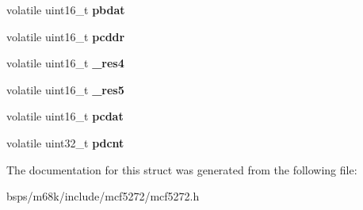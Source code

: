 \begin{DoxyCompactItemize}
\item 
\mbox{\label{structgpio__regs__t_a0a98abe30a8c4cc29ba7a40caaeab2ca}} 
volatile uint16\+\_\+t {\bfseries pbdat}
\item 
\mbox{\label{structgpio__regs__t_a88a32d5424c289f248e9c4159e7a158d}} 
volatile uint16\+\_\+t {\bfseries pcddr}
\item 
\mbox{\label{structgpio__regs__t_a869492a5c9fe94a31c16d2416a09e3c9}} 
volatile uint16\+\_\+t {\bfseries \+\_\+res4}
\item 
\mbox{\label{structgpio__regs__t_a08ecbc4e94134e38051b7d1025ecff82}} 
volatile uint16\+\_\+t {\bfseries \+\_\+res5}
\item 
\mbox{\label{structgpio__regs__t_ab3e9184400f313172c6242faeced8327}} 
volatile uint16\+\_\+t {\bfseries pcdat}
\item 
\mbox{\label{structgpio__regs__t_a8a8a85cf07acc4c2450f08aaf4e5febf}} 
volatile uint32\+\_\+t {\bfseries pdcnt}
\end{DoxyCompactItemize}


The documentation for this struct was generated from the following file\+:\begin{DoxyCompactItemize}
\item 
bsps/m68k/include/mcf5272/mcf5272.\+h\end{DoxyCompactItemize}
